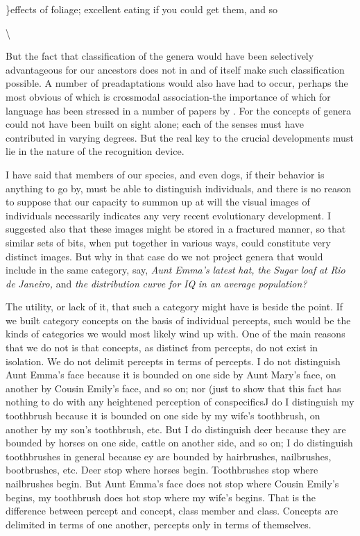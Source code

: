 \}effects of foliage; excellent eating if you could get them, and so

{\textbackslash}


But the fact that classification of the genera would have been selectively advantageous for our ancestors does not in and of itself make such classification possible. A number of preadaptations would also have had to occur, perhaps the most obvious of which is cross\-modal association-the importance of which for language has been stressed in a number of papers by \citet{Geschwind1974}. For the concepts of genera could not have been built on sight alone; each of the senses must have contributed in varying degrees. But the real key to the crucial developments must lie in the nature of the recognition device.

I have said that members of our species, and even dogs, if their behavior is anything to go by, must be able to distinguish individuals, and there is no reason to suppose that our capacity to summon up at will the visual images of individuals necessarily indicates any very recent evolutionary development. I suggested also that these images might be stored in a fractured manner, so that similar sets of bits, when put together in various ways, could constitute very distinct images. But why in that case do we not project genera that would include in the same category, say, \textit{Aunt} \textit{Emma's} \textit{latest} \textit{hat,} \textit{the} \textit{Sugar\-} \textit{loaf} \textit{at} \textit{Rio} \textit{de} \textit{Janeiro,} and \textit{the} \textit{distribution} \textit{curve} \textit{for} \textit{IQ} \textit{in} \textit{an} \textit{average} \textit{population?}

The utility, or lack of it, that such a category might have is
beside the point. If we built category concepts on the basis of in\-dividual percepts, such would be the kinds of categories we would most likely wind up with. One of the main reasons that we do not is that concepts, as distinct from percepts, do not exist in isolation. We do not delimit percepts in terms of percepts. I do not distinguish Aunt Emma's face because it is bounded on one side by Aunt Mary's face, on another by Cousin Emily's face, and so on; nor (just to show that this fact has nothing to do with any heightened perception of
conspecificsJ do I distinguish my toothbrush because it is bounded
on one side by my wife's toothbrush, on another by my son's tooth\-brush, etc. But I do distinguish deer because they are bounded by horses on one side, cattle on another side, and so on; I do distinguish toothbrushes in general because ey are bounded by hairbrushes,
nailbrushes, bootbrushes, etc. Deer stop where horses begin. Tooth\-brushes stop where nailbrushes begin. But Aunt Emma's face does not stop where Cousin Emily's begins, my toothbrush does hot stop where my wife's begins. That is the difference between percept and concept, class member and class. Concepts are delimited in terms of one another, percepts only in terms of themselves.

